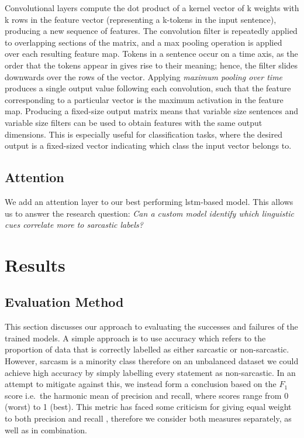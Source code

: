 \documentclass[12pt,a4paper]{article}
\begin{document}
Convolutional layers compute the dot product of a kernel vector of k weights with k rows in the feature vector (representing a k-tokens in the input sentence), producing a new sequence of features. The convolution filter is repeatedly applied to overlapping sections of the matrix, and a max pooling operation is applied over each resulting feature map. Tokens in a sentence occur on a time axis, as the order that the tokens appear in gives rise to their meaning; hence, the filter slides downwards over the rows of the vector. Applying \textit{maximum pooling over time} produces a single output value following each convolution, such that the feature corresponding to a particular vector is the maximum activation in the feature map. Producing a fixed-size output matrix means that variable size sentences and variable size filters can be used to obtain features with the same output dimensions. This is especially useful for classification tasks, where the desired output is a fixed-sized vector indicating which class the input vector belongs to.

\subsection{Attention}
\vspace{-4.2pt}
\noindent We add an attention layer to our best performing lstm-based model. This allows us to answer the research question: \textit{Can a custom model identify which linguistic cues correlate more to sarcastic labels?} 


\section{Results}
\subsection{Evaluation Method}
\noindent This section discusses our approach to evaluating the successes and failures of the trained models. A simple approach is to use accuracy which refers to the proportion of data that is correctly labelled as either sarcastic or non-sarcastic. However, sarcasm is a minority class therefore on an unbalanced dataset we could achieve high accuracy by simply labelling every statement as non-sarcastic. In an attempt to mitigate against this, we instead form a conclusion based on the $F_{1}$ score i.e.\ the harmonic mean of precision and recall, where scores range from 0 (worst) to 1 (best). This metric has faced some criticism for giving equal weight to both precision and recall \cite{hand2018note}, therefore we consider both measures separately, as well as in combination.\\
\end{document}
